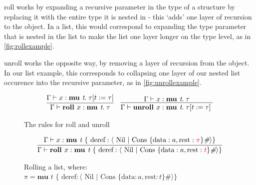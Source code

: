 \textsf{roll} works by expanding a recursive parameter 
in the type of a structure by replacing it with the entire type it is nested in  - this `adds' one 
layer of recursion to the object. In a list, this would correspond to expanding the type parameter
that is nested in the list to make the list one layer longer on the type level, as in \autoref{fig:rollexample}.

\textsf{unroll} works the opposite way, by removing a layer of recursion from the object. In our
list example, this corresponds to collapsing one layer of our nested list occurence into the
recursive parameter, as in \autoref{fig:unrollexample}. 

\begin{figure}
    \centering
    \begin{align*}
        \infer{
            \Gamma \vdash \textbf{roll } x : \textbf{mu } \textit{t}.\; \tau
        }{
            \Gamma \vdash x : \textbf{mu } \textit{t}.\; \tau[ t := \tau]
        }
        && \infer{
            \Gamma \vdash \textbf{unroll } x : \textbf{mu } \textit{t}.\; \tau[ t := \tau]\; 
        }{
            \Gamma \vdash x : \textbf{mu } \textit{t}.\; \tau
        }
    \end{align*}
    \caption{The rules for roll and unroll}
    \label{def:rollunroll}
\end{figure}

\begin{figure}
    \centering
    \begin{align*}
        \infer{
            \Gamma \vdash \textbf{roll } x : \textbf{mu } \textit{t } \{ \text{ deref}: \langle \text{ Nil } \vert \text{ Cons } \{ \text{data}: a, \text{rest}: {\color{red} t} \}\textit{\#} \rangle \} 
        }{
            \Gamma \vdash x : \textbf{mu } \textit{t } \{ \text{ deref}: \langle \text{ Nil } \vert \text{ Cons } \{ \text{data}: a, \text{rest}: {\color{red} \pi} \}\textit{\#} \rangle \} 
        }
    \end{align*}
    \caption{Rolling a list, where: \newline \protect\phantom{Figure x.x:} $\pi = \textbf{mu } \textit{t } \{ \text{ deref}: \langle \text{ Nil } \vert \text{ Cons } \{ \text{data}: a, \text{rest}: t \}\textit{\#} \rangle \}$}
    \label{fig:rollexample}
\end{figure}

